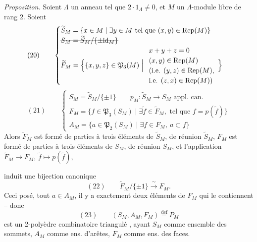 \documentclass[11pt,a4paper]{article}
\begin{document}
\emph{Proposition.} Soient $\Lambda$ un anneau tel que $2 \cdot 1_\Lambda \neq 0$, et $M$ un $\Lambda$-module libre de rang 2. Soient  
\[
(20)\qquad \begin{cases} \widetilde{S}_M = \{ x \in M \mid \exists y \in M \text{ tel que } (x,y) \in \mathrm{Rep}(M) \} \\ \text{\struck{$S_M = \widetilde{S}_M/\{\pm \mathrm{id}_M\}$}} \\ \widetilde{F}_M = \Bigl\{ \{x,y,z\} \in \mathfrak{P}_3(M) \Bigm| \begin{array}{l} x + y + z = 0 \\ (x,y) \in \mathrm{Rep}(M) \\ (\text{i.e. } (y,z) \in \mathrm{Rep}(M), \\ \text{i.e. } (z,x) \in \mathrm{Rep}(M)) \end{array} \Bigr\} \end{cases}
\]
\[
(21)\qquad \begin{cases} S_M = \widetilde{S}_M/\{\pm 1\} \qquad p_M : \widetilde{S}_M \to S_M \text{ appl. can.} \\ F_M = \{ f \in \mathfrak{P}_3(S_M) \mid \exists \widetilde{f} \in \widetilde{F}_M, \text{ tel que } f = p(\widetilde{f}) \} \\ A_M = \{ a \in \mathfrak{P}_2(S_M) \mid \exists f \in F_M,\ a \subset f \} \end{cases}
\]
Alors $\widetilde{F}_M$ est formé de parties à trois éléments de $\widetilde{S}_M$, de réunion $\widetilde{S}_M$, $F_M$ est formé de parties à trois éléments de $S_M$, de réunion $S_M$, et l'application  $\widetilde{F}_M \to F_M$, $\widetilde{f} \mapsto p(\widetilde{f})$,

induit une bijection canonique
\[
(22)\qquad \widetilde{F}_M/\{\pm 1\} \xrightarrow{\ \sim\ } F_M .
\]
Ceci posé,  tout $a \in A_M$, il y a exactement deux éléments de $F_M$ qui le contiennent -- donc
\[
(23)\qquad (S_M, A_M, F_M) \overset{\mathrm{def}}{=} P_M
\]
est un 2-polyèdre combinatoire triangulé , ayant $S_M$ comme ensemble des sommets, $A_M$ comme ens. d'arêtes, $F_M$ comme ens. des faces.
\end{document}
